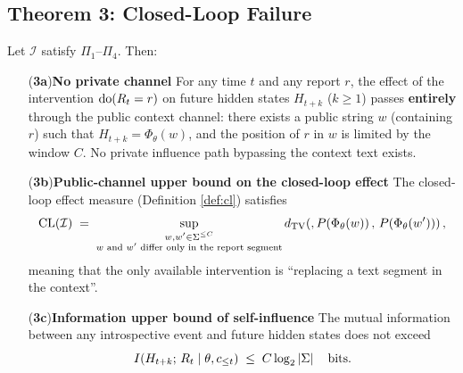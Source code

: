 \subsection{Theorem 3: Closed-Loop Failure}

\begin{theorem}\label{thm:closedloop}
Let $\mathcal{I}$ satisfy $\Pi_1$--$\Pi_4$. Then:

\begin{enumerate}[align=left, labelwidth=!, labelsep=0.8em, leftmargin=!, itemindent=0pt]
\item[(\textbf{3a})\textbf{No private channel}] For any time $t$ and any report $r$, the
effect of the intervention $\operatorname{do}(R_t = r)$ on future hidden states $H_{t+k}$ ($k \ge 1$)
passes \textbf{entirely} through the public context channel: there exists a public string $w$
(containing $r$) such that $H_{t+k} = \Phi_\theta(w)$, and the position of $r$ in $w$ is
limited by the window $C$. No private influence path bypassing the context text exists.
\item[(\textbf{3b})\textbf{Public-channel upper bound on the closed-loop effect}] The
closed-loop effect measure (Definition \ref{def:cl}) satisfies
\begin{equation}
\mathrm{CL}(\mathcal{I}) \;=\; \sup_{\substack{w, w' \in \Sigma^{\le C}\\ w \text{ and } w' \text{ differ only in the report segment}}}
d_{\mathrm{TV}}\!\left(,P\!\left(\Phi_\theta(w)\right),\, P\!\left(\Phi_\theta(w')\right)\right),
\label{eq:thm3b}
\end{equation}
meaning that the only available intervention is ``replacing a text segment in the context''.
\item[(\textbf{3c})\textbf{Information upper bound of self-influence}] The mutual information
between any introspective event and future hidden states does not exceed
\begin{equation}
I\!\left(H_{t+k};\, R_t \mid \theta, c_{\le t}\right) \;\le\; C \log_2\left\lvert \Sigma \right\rvert
\quad \text{bits}.
\label{eq:thm3c}
\end{equation}
\end{enumerate}
\end{theorem}

